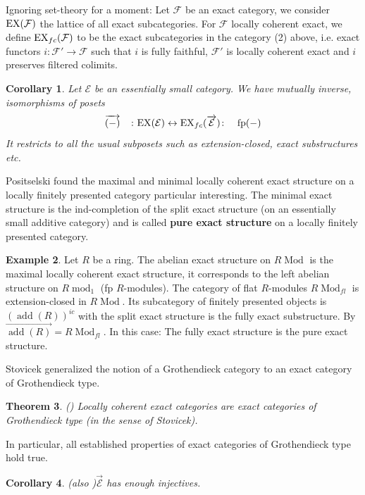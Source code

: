 \documentclass[11pt,a4paper]{amsart}
\theoremstyle{plain}
\newtheorem{thm}{Theorem}[section]
\newtheorem{cor}[thm]{Corollary}
\theoremstyle{definition}
\newtheorem{exa}[thm]{Example}
\DeclareMathOperator{\modu}{mod}
\DeclareMathOperator{\Modu}{Mod}
\newcommand{\mcE}{\mathcal{E}}
\newcommand{\mcF}{\mathcal{F}}
\DeclareMathOperator{\add}{add}
\begin{document}
Ignoring set-theory for a moment: Let $\mcF$ be an exact category, 
we consider ${\rm EX} (\mcF)$ the lattice of all exact subcategories. 
For $\mcF$ locally coherent exact, 
we define ${\rm EX}_{fc} (\mcF)$ to be the exact subcategories in the category (2) above, i.e. exact functors $i \colon \mcF'\to \mcF $ such that $i$ is fully faithful, $\mcF'$ is locally coherent exact and $i$ preserves filtered colimits.   
\begin{cor} Let $\mcE$ be an essentially small category. We have mutually inverse, isomorphisms of posets
\[
\overrightarrow{(-)} \quad \colon {\rm EX} (\mcE) \leftrightarrow {\rm EX}_{fc} (\overrightarrow{\mcE})\colon\quad  {\rm fp}(-)
\]
It restricts to all the usual subposets such as extension-closed, exact substructures etc. 
\end{cor}

Positselski found the maximal and minimal locally coherent exact structure on a locally finitely presented category particular interesting. The minimal exact structure is the ind-completion of the split exact structure (on an essentially small additive category) and is called \textbf{pure exact structure} on a locally finitely presented category. 

\begin{exa}
Let $R$ be a ring. 
The abelian exact structure on $R\Modu $ is the maximal locally coherent exact structure, it corresponds to the left abelian structure on $R\modu _1$ (fp $R$-modules). 
The category of flat $R$-modules $R\Modu _{fl}$ is extension-closed in $R\Modu $. Its subcategory of finitely presented objects is $(\add(R))^{ic}$ with the split exact structure is the fully exact substructure. By \cite[Thm 3]{CB} $\overrightarrow{\add(R)}=R\Modu _{fl}$. In this case: The fully exact structure is the pure exact structure. 
\end{exa}

Stovicek generalized the notion of a Grothendieck category to an exact category of Grothendieck type. 
\begin{thm} (\cite[Cor. 5.4]{P-locCoh}) Locally coherent exact categories are exact categories of Grothendieck type (in the sense of Stovicek).  
\end{thm}
In particular, all established properties of exact categories of Grothendieck type hold true. 
\begin{cor} (also \cite[Cor. 5.4]{P-locCoh})$\overrightarrow{\mcE}$ has enough injectives. 
\end{cor}


















\end{document}
